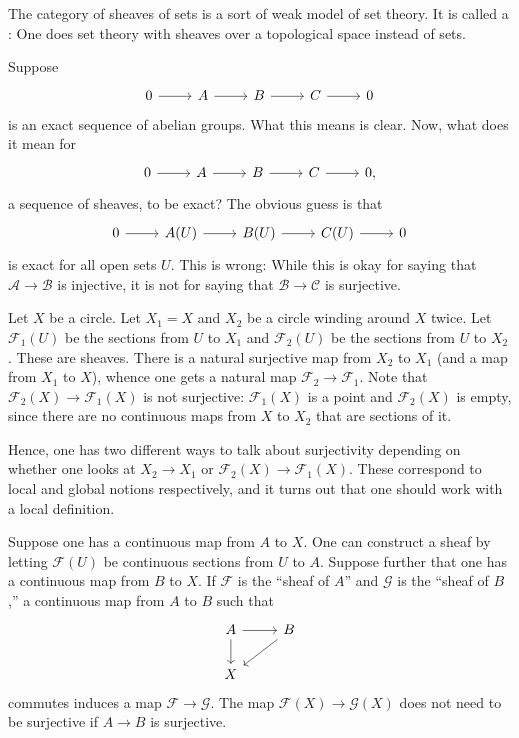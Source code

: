\documentclass [11 pt, oneside] {article}
\begin{document}
The category of sheaves of sets is a sort of weak model of set theory. It is called a : One does set theory with sheaves over a topological space instead of sets.

Suppose
\[
\begin{tikzcd}
	0\ar[r]&A\ar[r]&B\ar[r]&C\ar[r]&0
\end{tikzcd}
\]
is an exact sequence of abelian groups. What this means is clear. Now, what does it mean for
\[
\begin{tikzcd}
        0\ar[r]&\mathscr{A}\ar[r]&\mathscr{B}\ar[r]&\mathscr{C}\ar[r]&0,
\end{tikzcd}
\]
a sequence of sheaves, to be exact? The obvious guess is that
\[
\begin{tikzcd}
	0\ar[r]&\mathscr{A}(U)\ar[r]&\mathscr{B}(U)\ar[r]&\mathscr{C}(U)\ar[r]&0
\end{tikzcd}
\]
is exact for all open sets $U$. This is wrong: While this is okay for saying that $\mathscr{A}\longrightarrow \mathscr{B}$ is injective, it is not for saying that $\mathscr{B} \longrightarrow \mathscr{C}$ is surjective.

\begin{example}[ ]\label{}\text{}
Let $X$ be a circle. Let $X_1=X$ and $X_2$ be a circle winding around $X$ twice. Let $\mathscr{F}_1(U)$ be the sections from $U$ to $X_1$ and $\mathscr{F}_2(U)$ be the sections from $U$ to $X_2$. These are sheaves. There is a natural surjective map from $X_2$ to $X_1$ (and a map from $X_1$ to $X$), whence one gets a natural map $\mathscr{F}_2\longrightarrow \mathscr{F}_1$. Note that $\mathscr{F}_2(X) \longrightarrow \mathscr{F}_1(X)$ is not surjective: $\mathscr{F}_1(X)$ is a point and $\mathscr{F}_2(X)$ is empty, since there are no continuous maps from $X$ to $X_2$ that are sections of it.

Hence, one has two different ways to talk about surjectivity depending on whether one looks at $X_2\longrightarrow X_1$ or $\mathscr{F}_2(X) \longrightarrow \mathscr{F}_1(X)$. These correspond to local and global notions respectively, and it turns out that one should work with a local definition. 
\end{example}

Suppose one has a continuous map from $A$ to $X$. One can construct a sheaf by letting $\mathscr{F}(U)$ be continuous sections from $U$ to $A$. Suppose further that one has a continuous map from $B$ to $X$. If $\mathscr{F}$ is the ``sheaf of $A$'' and $\mathscr{G}$ is the ``sheaf of $B$,'' a continuous map from $A$ to $B$ such that
\[
\begin{tikzcd}
	A \ar[d]\ar[r] &B\ar[dl]\\X
\end{tikzcd}
\]
commutes induces a map $\mathscr{F}\longrightarrow \mathscr{G}$. The map $\mathscr{F}(X) \longrightarrow \mathscr{G}(X)$ does not need to be surjective if $A\longrightarrow B$ is surjective.
\end{document}
